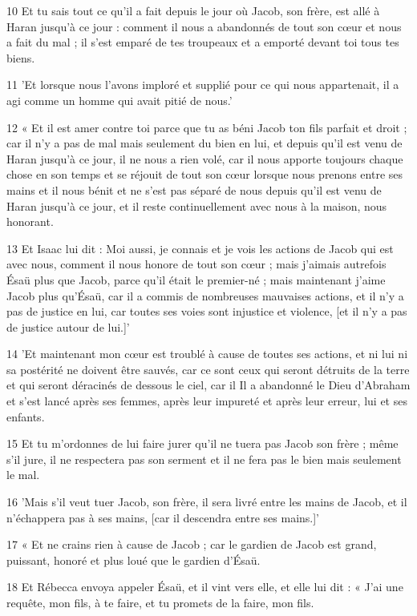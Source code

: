 \par 10 Et tu sais tout ce qu'il a fait depuis le jour où Jacob, son frère, est allé à Haran jusqu'à ce jour : comment il nous a abandonnés de tout son cœur et nous a fait du mal ; il s'est emparé de tes troupeaux et a emporté devant toi tous tes biens.
\par 11 'Et lorsque nous l'avons imploré et supplié pour ce qui nous appartenait, il a agi comme un homme qui avait pitié de nous.'
\par 12 « Et il est amer contre toi parce que tu as béni Jacob ton fils parfait et droit ; car il n'y a pas de mal mais seulement du bien en lui, et depuis qu'il est venu de Haran jusqu'à ce jour, il ne nous a rien volé, car il nous apporte toujours chaque chose en son temps et se réjouit de tout son cœur lorsque nous prenons entre ses mains et il nous bénit et ne s'est pas séparé de nous depuis qu'il est venu de Haran jusqu'à ce jour, et il reste continuellement avec nous à la maison, nous honorant.
\par 13 Et Isaac lui dit : Moi aussi, je connais et je vois les actions de Jacob qui est avec nous, comment il nous honore de tout son cœur ; mais j'aimais autrefois Ésaü plus que Jacob, parce qu'il était le premier-né ; mais maintenant j'aime Jacob plus qu'Ésaü, car il a commis de nombreuses mauvaises actions, et il n'y a pas de justice en lui, car toutes ses voies sont injustice et violence, [et il n'y a pas de justice autour de lui.]'
\par 14 'Et maintenant mon cœur est troublé à cause de toutes ses actions, et ni lui ni sa postérité ne doivent être sauvés, car ce sont ceux qui seront détruits de la terre et qui seront déracinés de dessous le ciel, car il Il a abandonné le Dieu d'Abraham et s'est lancé après ses femmes, après leur impureté et après leur erreur, lui et ses enfants.
\par 15 Et tu m'ordonnes de lui faire jurer qu'il ne tuera pas Jacob son frère ; même s'il jure, il ne respectera pas son serment et il ne fera pas le bien mais seulement le mal.
\par 16 'Mais s'il veut tuer Jacob, son frère, il sera livré entre les mains de Jacob, et il n'échappera pas à ses mains, [car il descendra entre ses mains.]'
\par 17 « Et ne crains rien à cause de Jacob ; car le gardien de Jacob est grand, puissant, honoré et plus loué que le gardien d'Ésaü.
\par 18 Et Rébecca envoya appeler Ésaü, et il vint vers elle, et elle lui dit : « J'ai une requête, mon fils, à te faire, et tu promets de la faire, mon fils.
